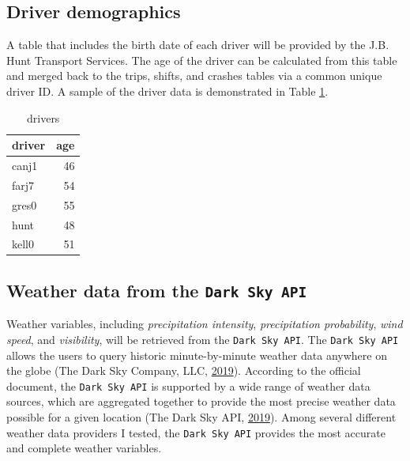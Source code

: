 \documentclass[12pt]{book}
\numberwithin{equation}{chapter}
\begin{document}
\hypertarget{driver-demographics}{%
\subsection{Driver demographics}\label{driver-demographics}}

A table that includes the birth date of each driver will be provided by the J.B. Hunt Transport Services. The age of the driver can be calculated from this table and merged back to the trips, shifts, and crashes tables via a common unique driver ID. A sample of the driver data is demonstrated in Table \ref{tab:drivers}.

\begin{table}[t]

\caption{\label{tab:drivers}drivers}
\centering
\begin{tabular}{lr}
\toprule
driver & age\\
\midrule
canj1 & 46\\
farj7 & 54\\
gres0 & 55\\
hunt & 48\\
kell0 & 51\\
\bottomrule
\end{tabular}
\end{table}

\hypertarget{weather-data-from-the-dark-sky-api}{%
\subsection{\texorpdfstring{Weather data from the \texttt{Dark\ Sky\ API}}{Weather data from the Dark Sky API}}\label{weather-data-from-the-dark-sky-api}}

Weather variables, including \emph{precipitation intensity}, \emph{precipitation probability}, \emph{wind speed}, and \emph{visibility}, will be retrieved from the \texttt{Dark\ Sky\ API}.
The \texttt{Dark\ Sky\ API} allows the users to query historic minute-by-minute weather data anywhere on the globe (The Dark Sky Company, LLC, \protect\hyperlink{ref-darksky}{2019}).
According to the official document, the \texttt{Dark\ Sky\ API} is supported by a wide range of weather data sources, which are aggregated together to provide the most precise weather data possible for a given location (The Dark Sky API, \protect\hyperlink{ref-darkskyds}{2019}).
Among several different weather data providers I tested, the \texttt{Dark\ Sky\ API} provides the most accurate and complete weather variables.
\end{document}
